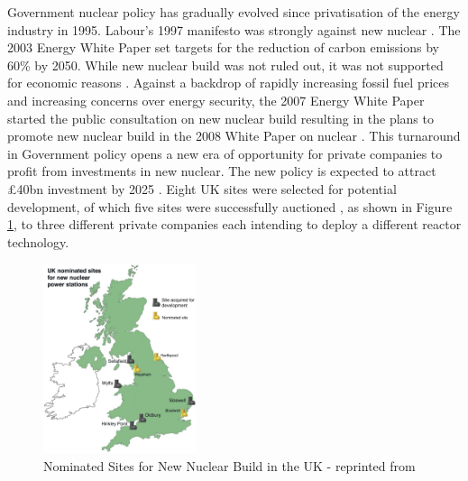 Government nuclear policy has gradually evolved since privatisation of the energy industry in 1995. 
Labour’s 1997 manifesto was strongly against new nuclear \cite{Birmingham2012}. 
The 2003 Energy White Paper set targets for the reduction of carbon emissions by 60\% by 2050. 
While new nuclear build was not ruled out, it was not supported for economic reasons \cite{WP2003}. 
Against a backdrop of rapidly increasing fossil fuel prices and increasing concerns over energy security, the 2007 Energy White Paper started the public consultation on new nuclear build \cite{WP2007} resulting in the plans to promote new nuclear build in the 2008 White Paper on nuclear \cite{WP2008}.
This turnaround in Government policy opens a new era of opportunity for private companies to profit from investments in new nuclear. 
The new policy is expected to attract \pounds40bn investment by 2025 \cite{Birmingham2012}.
Eight UK sites were selected for potential development, of which five sites were successfully auctioned \cite{Birmingham2012}, as shown in Figure \ref{figure:NNB}, to three different private companies each intending to deploy a different reactor technology.

\begin{figure}[!h]
\centering
\includegraphics[width = 0.4\textwidth]{Figures/uk-nuclear-map.jpeg}
\caption{Nominated Sites for New Nuclear Build in the UK - reprinted from \cite{NAMRC}}
\label{figure:NNB}
\end{figure}

